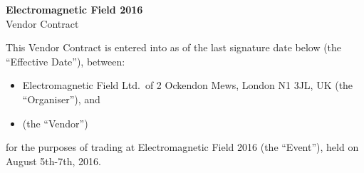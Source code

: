 

\selectfont

\begin{center}
{\bf \LARGE Electromagnetic Field 2016}\\[12pt]
{\Large Vendor Contract}
\end{center}

This Vendor Contract is entered into as of the last signature date below (the ``Effective Date''), between:
\begin{itemize}
    \item Electromagnetic Field Ltd.\ of 2 Ockendon Mews, London N1 3JL, UK (the ``Organiser''), and
    \item <company name and address> (the ``Vendor'')
\end{itemize}

for the purposes of trading at Electromagnetic Field 2016 (the ``Event''), held on August 5th-7th, 2016.

